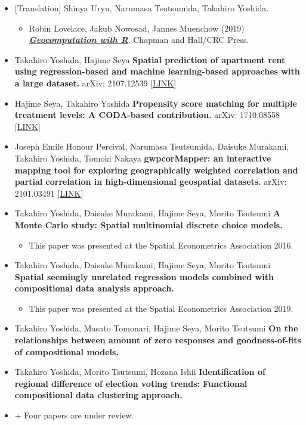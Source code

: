 \documentclass[]{book}
\providecommand{\tightlist}{%
  \setlength{\itemsep}{0pt}\setlength{\parskip}{0pt}}
\begin{document}
\begin{itemize}
\tightlist
\item
  {[}Translation{]} Shinya Uryu, Narumasa Tsutsumida, Takahiro Yoshida.

  \begin{itemize}
  \tightlist
  \item
    Robin Lovelace, Jakub Nowosad, Jannes Muenchow (2019)
    \textbf{\emph{\href{https://geocompr.robinlovelace.net/}{Geocomputation with R}}}. Chapman and Hall/CRC Press.
  \end{itemize}
\item
  Takahiro Yoshida, Hajime Seya
  \textbf{Spatial prediction of apartment rent using regression-based and machine learning-based approaches with a large dataset.}
  arXiv: 2107.12539 {[}\href{https://arxiv.org/abs/2107.12539}{LINK}{]}
\item
  Hajime Seya, Takahiro Yoshida
  \textbf{Propensity score matching for multiple treatment levels: A CODA-based contribution.}
  arXiv: 1710.08558 {[}\href{https://arxiv.org/abs/1710.08558}{LINK}{]}
\item
  Joseph Emile Honour Percival, Narumasa Tsutsumida, Daisuke Murakami, Takahiro Yoshida, Tomoki Nakaya
  \textbf{gwpcorMapper: an interactive mapping tool for exploring geographically weighted correlation and partial correlation in high-dimensional geospatial datasets.}
  arXiv: 2101.03491 {[}\href{https://arxiv.org/abs/2101.03491}{LINK}{]}
\item
  Takahiro Yoshida, Daisuke Murakami, Hajime Seya, Morito Tsutsumi
  \textbf{A Monte Carlo study: Spatial multinomial discrete choice models.}

  \begin{itemize}
  \tightlist
  \item
    This paper was presented at the Spatial Econometrics Association 2016.
  \end{itemize}
\item
  Takahiro Yoshida, Daisuke Murakami, Hajime Seya, Morito Tsutsumi
  \textbf{Spatial seemingly unrelated regression models combined with compositional data analysis approach.}

  \begin{itemize}
  \tightlist
  \item
    This paper was presented at the Spatial Econometrics Association 2019.
  \end{itemize}
\item
  Takahiro Yoshida, Masato Tomonari, Hajime Seya, Morito Tsutsumi
  \textbf{On the relationships between amount of zero responses and goodness-of-fits of compositional models.}
\item
  Takahiro Yoshida, Morito Tsutsumi, Hozana Ishii
  \textbf{Identification of regional difference of election voting trends: Functional compositional data clustering approach.}
\item
  + Four papers are under review.
\end{itemize}
\end{document}
